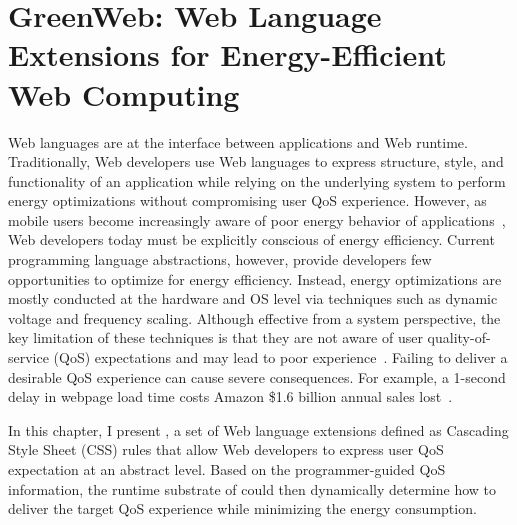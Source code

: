 
\chapter{GreenWeb: Web Language Extensions for Energy-Efficient Web Computing}
\label{sec:lang}


Web languages are at the interface between applications and Web runtime. Traditionally, Web developers use Web languages to express structure, style, and functionality of an application while relying on the underlying system to perform energy optimizations without compromising user QoS experience. However, as mobile users become increasingly aware of poor energy behavior of applications~\cite{badappreviews,appdeletion}, Web developers today must be  explicitly conscious of energy efficiency. Current programming language abstractions, however, provide developers few opportunities to optimize for energy efficiency. Instead, energy optimizations are mostly conducted at the hardware and OS level via techniques such as dynamic voltage and frequency scaling. Although effective from a system perspective, the key limitation of these techniques is that they are not aware of user quality-of-service (QoS) expectations and may lead to poor experience~\cite{big-little,ebs,pgdvfs}. Failing to deliver a desirable QoS experience can cause severe consequences. For example, a 1-second delay in webpage load time costs Amazon \$1.6 billion annual sales lost~\cite{Eaton:2013uq}.

In this chapter, I present \greenweb, a set of Web language extensions defined as Cascading Style Sheet (CSS) rules that allow Web developers to express user QoS expectation at an abstract level. Based on the programmer-guided QoS information, the runtime substrate of \greenweb could then dynamically determine how to deliver the target QoS experience while minimizing the energy consumption.


